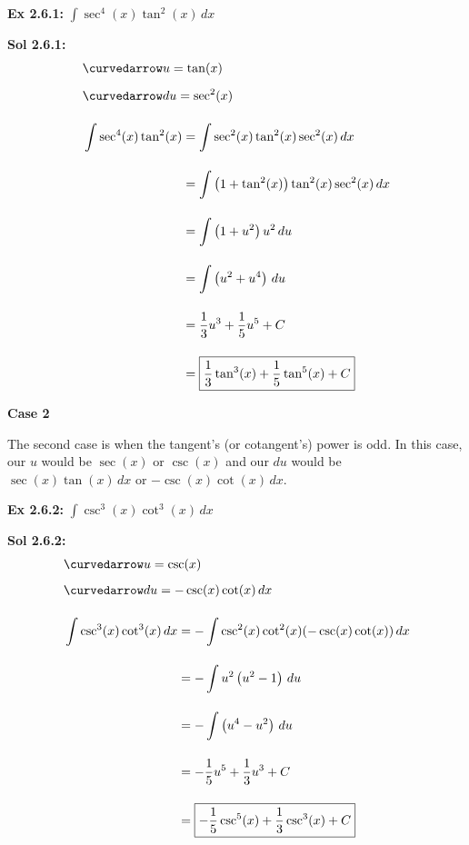 \begin{tcolorbox}[example]
    \textbf{Ex 2.6.1: } $\int \sec^4 (x)\tan^2 (x) \, dx$
\end{tcolorbox}
\begin{tcolorbox}[solution]
    \textbf{Sol 2.6.1: } \begin{align*}
        & \curvedarrow u = \tan (x) \\[5.5pt]
        & \curvedarrow du = \sec^2 (x) \\[11pt]
        & \int \sec^4 (x)\tan^2 (x) \begin{aligned}[t]
            & = \int \sec^2 (x)\tan^2 (x)\sec^2 (x) \, dx \\[11pt]
            & = \int \left(1 + \tan^2 (x)\right)\tan^2 (x)\sec^2 (x) \, dx \\[11pt]
            & = \int \left(1 + u^2\right)u^2 \, du \\[11pt]
            & = \int \left(u^2 + u^4\right) \, du \\[11pt]
            & = \dfrac{1}{3}u^3 + \dfrac{1}{5}u^5 + C \\[11pt]
            & = \boxed{\dfrac{1}{3}\tan^3 (x) + \dfrac{1}{5}\tan^5 (x) + C}
        \end{aligned}
    \end{align*}
\end{tcolorbox} \vspace{11pt}

\textbf{Case 2} \par

The second case is when the tangent's (or cotangent's) power is odd. In this case, our $u$ would be $\sec(x)$ or $\csc(x)$ and our $du$ would be $\sec (x)\tan (x) \, dx$ or $-\csc (x)\cot (x) \, dx$. \par

\begin{tcolorbox}[example]
    \textbf{Ex 2.6.2: } $\int \csc^3 (x)\cot^3 (x) \, dx$
\end{tcolorbox}
\begin{tcolorbox}[solution]
    \textbf{Sol 2.6.2: } \begin{align*}
        & \curvedarrow u = \csc (x) \\[5.5pt]
        & \curvedarrow du = -\csc (x)\cot (x) \, dx \\[11pt]
        & \int \csc^3 (x)\cot^3 (x) \, dx \begin{aligned}[t]
            & = -\int \csc^2 (x)\cot^2 (x)(-\csc (x)\cot (x)) \, dx \\[11pt]
            & = -\int u^2\left(u^2 - 1\right) \, du \\[11pt]
            & = -\int \left(u^4 - u^2\right) \, du \\[11pt]
            & = -\dfrac{1}{5}u^5 + \dfrac{1}{3}u^3 + C \\[11pt]
            & = \boxed{-\dfrac{1}{5}\csc^5 (x) + \dfrac{1}{3}\csc^3 (x) + C}
        \end{aligned}
    \end{align*}
\end{tcolorbox}

